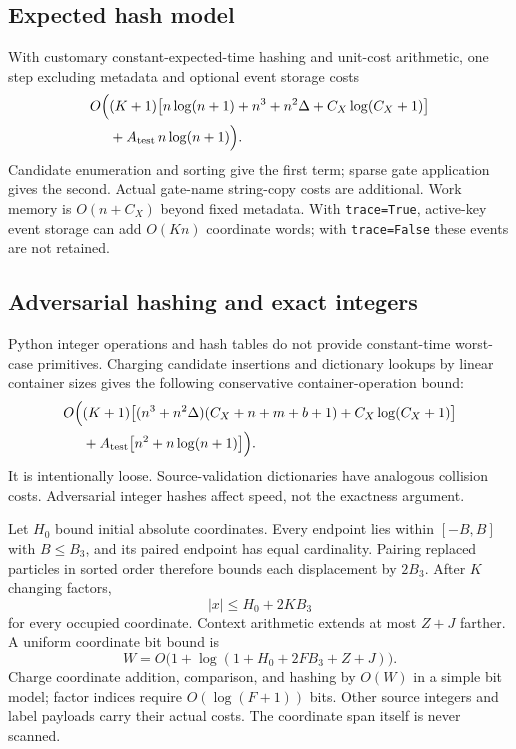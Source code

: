 \documentclass[11pt,a4paper]{article}
\numberwithin{equation}{section}
\begin{document}
\subsection{Expected hash model}
With customary constant-expected-time hashing and unit-cost arithmetic, one step excluding metadata and optional event storage costs
\begin{align*}
O\Bigl(& (K+1)\bigl[n\log(n+1)+n^3+n^2\Delta
                      +C_X\log(C_X+1)\bigr]\\
      &+A_{\rm test}\,n\log(n+1)\Bigr).
\end{align*}
Candidate enumeration and sorting give the first term; sparse gate application gives the second. Actual gate-name string-copy costs are additional. Work memory is $O(n+C_X)$ beyond fixed metadata. With \texttt{trace=True}, active-key event storage can add $O(Kn)$ coordinate words; with \texttt{trace=False} these events are not retained.

\subsection{Adversarial hashing and exact integers}
Python integer operations and hash tables do not provide constant-time worst-case primitives. Charging candidate insertions and dictionary lookups by linear container sizes gives the following conservative container-operation bound:
\begin{align*}
O\Bigl(& (K+1)\bigl[(n^3+n^2\Delta)(C_X+n+m+b+1)
                    +C_X\log(C_X+1)\bigr]\\
      &+A_{\rm test}\bigl[n^2+n\log(n+1)\bigr]\Bigr).
\end{align*}
It is intentionally loose. Source-validation dictionaries have analogous collision costs. Adversarial integer hashes affect speed, not the exactness argument.

Let $H_0$ bound initial absolute coordinates. Every endpoint lies within $[-B,B]$ with $B\leq B_3$, and its paired endpoint has equal cardinality. Pairing replaced particles in sorted order therefore bounds each displacement by $2B_3$. After $K$ changing factors,
\[
|x|\leq H_0+2KB_3
\]
for every occupied coordinate. Context arithmetic extends at most $Z+J$ farther. A uniform coordinate bit bound is
\[
W=O\bigl(1+\log(1+H_0+2FB_3+Z+J)\bigr).
\]
Charge coordinate addition, comparison, and hashing by $O(W)$ in a simple bit model; factor indices require $O(\log(F+1))$ bits. Other source integers and label payloads carry their actual costs. The coordinate span itself is never scanned.
\end{document}
